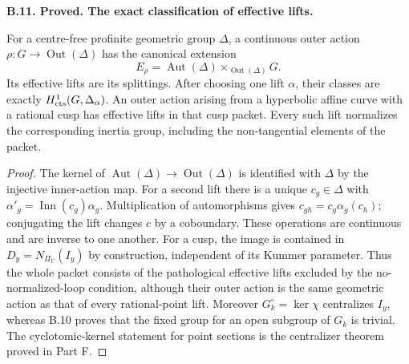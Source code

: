 \documentclass[11pt,oneside]{article}
\makeatletter
\newcounter{statementanchor}
\newenvironment{statement}[3]{%
 \refstepcounter{statementanchor}\def\@currentlabel{#1}%
 \par\addvspace{9pt}\noindent
 \textbf{#1. #2. #3.}\par\nobreak\noindent\ignorespaces
}{\par\addvspace{5pt}}
\makeatother
\begin{document}
\begin{statement}{B.11}{Proved}{The exact classification of effective lifts}
\label{st:B.11}

For a centre-free profinite geometric group $\Delta$, a continuous
outer action $\rho:G\to\operatorname{Out}(\Delta)$ has the canonical
extension
\[
 E_\rho=\operatorname{Aut}(\Delta)
             \times_{\operatorname{Out}(\Delta)}G.
\]
Its effective lifts are its splittings.  After choosing one lift
$\alpha$, their classes are exactly $H^1_{\rm cts}(G,\Delta_\alpha)$.
An outer action arising from a hyperbolic affine curve with a rational
cusp has effective lifts in that cusp packet.  Every such lift
normalizes the corresponding inertia group, including the
non-tangential elements of the packet.
\end{statement}
\begin{proof}
The kernel of $\operatorname{Aut}(\Delta)\to\operatorname{Out}(\Delta)$
is identified with $\Delta$ by the injective inner-action map.
For a second lift there is a unique $c_g\in\Delta$ with
$\alpha'_g=\operatorname{Inn}(c_g)\alpha_g$.  Multiplication of
automorphisms gives
$c_{gh}=c_g\alpha_g(c_h)$; conjugating the lift changes $c$ by a
coboundary.  These operations are continuous and are inverse to one
another.  For a cusp, the image is contained in $D_y=N_{\Pi_U}(I_y)$
by construction, independent of its Kummer parameter.  Thus the
whole packet consists of the pathological effective lifts excluded
by the no-normalized-loop condition, although their outer action is
the same geometric action as that of every rational-point lift.
Moreover $G_k^\circ=\ker\chi$ centralizes $I_y$, whereas B.10 proves
that the fixed group for an open subgroup of $G_k$ is trivial.
The cyclotomic-kernel statement for point sections is the
centralizer theorem proved in Part F.
\end{proof}
\end{document}
